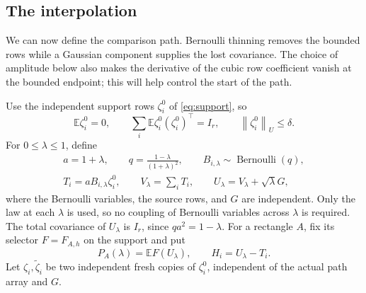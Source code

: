 \documentclass[11pt,a4paper]{article}
\theoremstyle{remark}
\newcommand{\E}{\mathbb E}
\newcommand{\norm}[1]{\left\lVert#1\right\rVert}
\begin{document}
\subsection{The interpolation}
\label{an:sec:path}

We can now define the comparison path.  Bernoulli thinning removes the
bounded rows while a Gaussian component supplies the lost covariance.
The choice of amplitude below also makes the derivative of the cubic
row coefficient vanish at the bounded endpoint; this will help control
the start of the path.

Use the independent support rows \(\zeta_i^0\) of
\eqref{eq:support}, so
\[
 \E\zeta_i^0=0,\qquad
 \sum_i\E\zeta_i^0(\zeta_i^0)^\top=I_r,
 \qquad \norm{\zeta_i^0}_U\le\delta.
\]
For \(0\le\lambda\le1\), define
\begin{equation}
 \begin{gathered}
 a=1+\lambda,\qquad q=\frac{1-\lambda}{(1+\lambda)^2},
 \qquad B_{i,\lambda}\sim\operatorname{Bernoulli}(q),\\
 T_i=aB_{i,\lambda}\zeta_i^0,\qquad V_\lambda=\sum_iT_i,
 \qquad U_\lambda=V_\lambda+\sqrt\lambda G,
 \end{gathered}
 \label{an:path}
\end{equation}
where the Bernoulli variables, the source rows, and \(G\) are
independent.  Only the law at each \(\lambda\) is used, so no
coupling of Bernoulli variables across \(\lambda\) is required.
The total covariance of \(U_\lambda\) is \(I_r\), since
\(qa^2=1-\lambda\).  For a rectangle \(A\), fix its selector
\(F=F_{A,h}\) on the support and put
\[
 P_A(\lambda)=\E F(U_\lambda),\qquad H_i=U_\lambda-T_i.
\]
Let \(\zeta_i,\widetilde\zeta_i\) be two independent fresh copies of
\(\zeta_i^0\), independent of the actual path array and \(G\).
\end{document}
